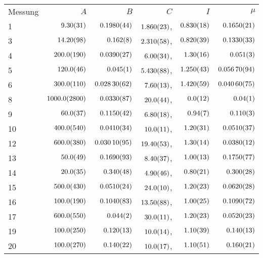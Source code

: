 \begin{tabular}{l|r|r|r|r|r}
Messung & $A$ & $B$ & $C$ & $I$ & $\mu$ \\
1 & $\num{9.3+-0.31}$ & $\num{0.198+-0.0044}$ & $\num{1.86+-0.023}$, & $\num{0.83+-0.018}$ & $\num{0.165+-0.0021}$ \\
3 & $\num{14.2+-0.98}$ & $\num{0.162+-0.008}$ & $\num{2.31+-0.058}$, & $\num{0.82+-0.039}$ & $\num{0.133+-0.0033}$ \\
4 & $\num{200+-19.0}$ & $\num{0.039+-0.0027}$ & $\num{6.0+-0.34}$, & $\num{1.3+-0.16}$ & $\num{0.051+-0.003}$ \\
5 & $\num{120+-4.6}$ & $\num{0.045+-0.001}$ & $\num{5.43+-0.088}$, & $\num{1.25+-0.043}$ & $\num{0.0567+-0.00094}$ \\
6 & $\num{300+-11.0}$ & $\num{0.0283+-0.00062}$ & $\num{7.6+-0.13}$, & $\num{1.42+-0.059}$ & $\num{0.0406+-0.00075}$ \\
8 & $\num{1000+-280.0}$ & $\num{0.033+-0.0087}$ & $\num{20+-4.4}$, & $\num{0+-1.2}$ & $\num{0.04+-0.01}$ \\
9 & $\num{60+-3.7}$ & $\num{0.115+-0.0042}$ & $\num{6.8+-0.18}$, & $\num{0.94+-0.07}$ & $\num{0.11+-0.003}$ \\
10 & $\num{400+-54.0}$ & $\num{0.041+-0.0034}$ & $\num{10+-1.1}$, & $\num{1.2+-0.31}$ & $\num{0.051+-0.0037}$ \\
12 & $\num{600+-38.0}$ & $\num{0.0301+-0.00095}$ & $\num{19.4+-0.53}$, & $\num{1.3+-0.14}$ & $\num{0.038+-0.0012}$ \\
13 & $\num{50+-4.9}$ & $\num{0.169+-0.0093}$ & $\num{8.4+-0.37}$, & $\num{1.0+-0.13}$ & $\num{0.175+-0.0077}$ \\
14 & $\num{20+-3.5}$ & $\num{0.34+-0.048}$ & $\num{4.9+-0.46}$, & $\num{0.8+-0.21}$ & $\num{0.3+-0.028}$ \\
15 & $\num{500+-43.0}$ & $\num{0.051+-0.0024}$ & $\num{24+-1.0}$, & $\num{1.2+-0.23}$ & $\num{0.062+-0.0028}$ \\
16 & $\num{100+-19.0}$ & $\num{0.104+-0.0083}$ & $\num{13.5+-0.88}$, & $\num{1.0+-0.25}$ & $\num{0.109+-0.0072}$ \\
17 & $\num{600+-55.0}$ & $\num{0.044+-0.002}$ & $\num{30+-1.1}$, & $\num{1.2+-0.23}$ & $\num{0.052+-0.0023}$ \\
19 & $\num{100+-25.0}$ & $\num{0.12+-0.013}$ & $\num{10+-1.4}$, & $\num{1.1+-0.39}$ & $\num{0.14+-0.013}$ \\
20 & $\num{100+-27.0}$ & $\num{0.14+-0.022}$ & $\num{10+-1.7}$, & $\num{1.1+-0.51}$ & $\num{0.16+-0.021}$ \\

\end{tabular}
